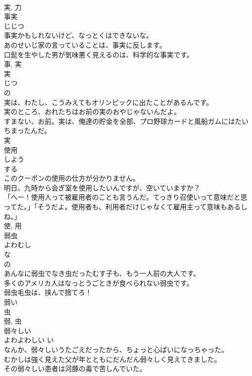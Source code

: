 \documentclass[8pt]{extreport}
\begin{document}
\begin{CJK}{UTF8}{min}
\\	実, 力	
\\	事実	
\\	じじつ	
\\	事実かもしれないけど、なっとくはできないな。	
\\	あのせいじ家の言っていることは、事実に反します。	
\\	口髭を生やした男が気味悪く見えるのは、科学的な事実です。	
\\	事, 実	
\\	実	
\\	じつ	
\\	の 
\\	実は、わたし、こうみえてもオリンピックに出たことがあるんです。	
\\	実のところ、おれたちはお前の実のおやじゃないんだよ。	
\\	すまない、お前。実は、俺達の貯金を全部、プロ野球カードと風船ガムにはたいちまったんだ。	
\\	実	
\\	使用	
\\	しよう	
\\	する 
\\	このクーポンの使用の仕方が分かりません。	
\\	明日、九時から会ぎ室を使用したいんですが、空いていますか？	
\\	「へー！使用人って被雇用者のことも言うんだ。てっきり召使いって意味だと思ってた。」「そうだよ。使用者も、利用者だけじゃなくて雇用主って意味もあるしね。」	
\\	使, 用	
\\	弱虫	
\\	よわむし	
\\	な 
\\	の 
\\	あんなに弱虫でなき虫だったむす子も、もう一人前の大人です。	
\\	多くのアメリカ人はなっとうごときが食べられない弱虫です。	
\\	弱虫毛虫は、挟んで捨てろ！	
\\	弱い 
\\	虫 
\\	弱, 虫	
\\	弱々しい	
\\	よわよわしい	い 
\\	なんか、弱々しいうたごえだったから、ちょっと心ぱいになっちゃった。	
\\	むかしは強く見えた父が年とともにだんだん弱々しく見えてきました。	
\\	その弱々しい患者は河豚の毒で苦しんでいた。	

\end{CJK}
\end{document}
